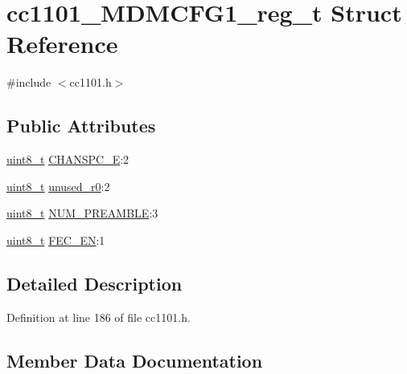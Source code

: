 \hypertarget{structcc1101___m_d_m_c_f_g1__reg__t}{}\section{cc1101\+\_\+\+M\+D\+M\+C\+F\+G1\+\_\+reg\+\_\+t Struct Reference}
\label{structcc1101___m_d_m_c_f_g1__reg__t}


{\ttfamily \#include $<$cc1101.\+h$>$}

\subsection*{Public Attributes}
\begin{DoxyCompactItemize}
\item 
\hyperlink{_p_e___types_8h_aba7bc1797add20fe3efdf37ced1182c5}{uint8\+\_\+t} \hyperlink{structcc1101___m_d_m_c_f_g1__reg__t_a9eb6464e035652c60cb477bee131f778}{C\+H\+A\+N\+S\+P\+C\+\_\+E}\+:2
\item 
\hyperlink{_p_e___types_8h_aba7bc1797add20fe3efdf37ced1182c5}{uint8\+\_\+t} \hyperlink{structcc1101___m_d_m_c_f_g1__reg__t_a08d4d43e0250938bc22e94e2c604ead0}{unused\+\_\+r0}\+:2
\item 
\hyperlink{_p_e___types_8h_aba7bc1797add20fe3efdf37ced1182c5}{uint8\+\_\+t} \hyperlink{structcc1101___m_d_m_c_f_g1__reg__t_a01b118e0865bf56f6e35977f2687564e}{N\+U\+M\+\_\+\+P\+R\+E\+A\+M\+B\+LE}\+:3
\item 
\hyperlink{_p_e___types_8h_aba7bc1797add20fe3efdf37ced1182c5}{uint8\+\_\+t} \hyperlink{structcc1101___m_d_m_c_f_g1__reg__t_abd75c28d96d4a1912d015453474f2553}{F\+E\+C\+\_\+\+EN}\+:1
\end{DoxyCompactItemize}


\subsection{Detailed Description}


Definition at line 186 of file cc1101.\+h.



\subsection{Member Data Documentation}

